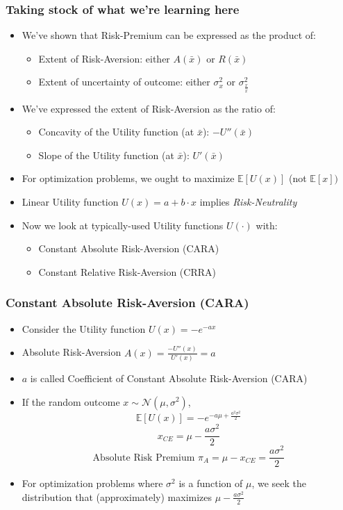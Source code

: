 \documentclass[handout]{beamer}
\begin{document}
\begin{frame}
\frametitle{Taking stock of what we're learning here}
\pause
\begin{itemize}[<+->]
\item We've shown that Risk-Premium can be expressed as the product of:
\begin{itemize}
\item Extent of Risk-Aversion: either $A(\bar{x})$ or $R(\bar{x})$
\item Extent of uncertainty of outcome: either $\sigma_x^2$ or $\sigma_{\frac {x} {\bar{x}}}^2$
\end{itemize}
\item We've expressed the extent of Risk-Aversion as the ratio of:
\begin{itemize}
\item Concavity of the Utility function (at $\bar{x}$): $-U''(\bar{x})$
\item Slope of the Utility function (at $\bar{x}$): $U'(\bar{x})$
\end{itemize}
\item For optimization problems, we ought to maximize $\mathbb{E}[U(x)]$ (not $\mathbb{E}[x])$
\item Linear Utility function $U(x) = a + b \cdot x$ implies {\em Risk-Neutrality}
\item Now we look at typically-used Utility functions $U(\cdot)$ with:
\begin{itemize}
\item Constant Absolute Risk-Aversion (CARA)
\item Constant Relative Risk-Aversion (CRRA)
\end{itemize}
\end{itemize}
\end{frame}

\begin{frame}
\frametitle{Constant Absolute Risk-Aversion (CARA)}
\pause
\begin{itemize}[<+->]
\item Consider the Utility function $U(x) = - e^{-ax}$
\item Absolute Risk-Aversion $A(x) = \frac {-U''(x)} {U'(x)} = a$
\item $a$ is called Coefficient of Constant Absolute Risk-Aversion (CARA)
\item If the random outcome $x \sim \mathcal{N}(\mu, \sigma^2)$,
$$\mathbb{E}[U(x)] = -e^{-a \mu + \frac {a^2 \sigma^2} 2}$$
$$x_{CE} = \mu - \frac {a \sigma^2} 2$$
$$\mbox{Absolute Risk Premium } \pi_A = \mu - x_{CE} =  \frac {a \sigma^2} 2$$
\item For optimization problems where $\sigma^2$ is a function of $\mu$, we seek the distribution that (approximately) maximizes $\mu - \frac {a \sigma^2} 2$
\end{itemize}
\end{frame}
\end{document}
